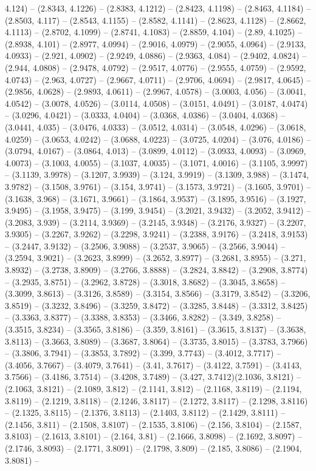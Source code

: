 4.124) -- (2.8343, 4.1226) -- (2.8383, 4.1212) -- (2.8423, 4.1198) -- (2.8463, 4.1184) -- (2.8503, 4.117) -- (2.8543, 4.1155) -- (2.8582, 4.1141) -- (2.8623, 4.1128) -- (2.8662, 4.1113) -- (2.8702, 4.1099) -- (2.8741, 4.1083) -- (2.8859, 4.104) -- (2.89, 4.1025) -- (2.8938, 4.101) -- (2.8977, 4.0994) -- (2.9016, 4.0979) -- (2.9055, 4.0964) -- (2.9133, 4.0933) -- (2.921, 4.0902) -- (2.9249, 4.0886) -- (2.9363, 4.084) -- (2.9402, 4.0824) -- (2.944, 4.0808) -- (2.9478, 4.0792) -- (2.9517, 4.0776) -- (2.9555, 4.0759) -- (2.9592, 4.0743) -- (2.963, 4.0727) -- (2.9667, 4.0711) -- (2.9706, 4.0694) -- (2.9817, 4.0645) -- (2.9856, 4.0628) -- (2.9893, 4.0611) -- (2.9967, 4.0578) -- (3.0003, 4.056) -- (3.0041, 4.0542) -- (3.0078, 4.0526) -- (3.0114, 4.0508) -- (3.0151, 4.0491) -- (3.0187, 4.0474) -- (3.0296, 4.0421) -- (3.0333, 4.0404) -- (3.0368, 4.0386) -- (3.0404, 4.0368) -- (3.0441, 4.035) -- (3.0476, 4.0333) -- (3.0512, 4.0314) -- (3.0548, 4.0296) -- (3.0618, 4.0259) -- (3.0653, 4.0242) -- (3.0688, 4.0223) -- (3.0725, 4.0204) -- (3.076, 4.0186) -- (3.0794, 4.0167) -- (3.0864, 4.013) -- (3.0899, 4.0112) -- (3.0933, 4.0093) -- (3.0969, 4.0073) -- (3.1003, 4.0055) -- (3.1037, 4.0035) -- (3.1071, 4.0016) -- (3.1105, 3.9997) -- (3.1139, 3.9978) -- (3.1207, 3.9939) -- (3.124, 3.9919) -- (3.1309, 3.988) -- (3.1474, 3.9782) -- (3.1508, 3.9761) -- (3.154, 3.9741) -- (3.1573, 3.9721) -- (3.1605, 3.9701) -- (3.1638, 3.968) -- (3.1671, 3.9661) -- (3.1864, 3.9537) -- (3.1895, 3.9516) -- (3.1927, 3.9495) -- (3.1958, 3.9475) -- (3.199, 3.9454) -- (3.2021, 3.9432) -- (3.2052, 3.9412) -- (3.2083, 3.939) -- (3.2114, 3.9369) -- (3.2145, 3.9348) -- (3.2176, 3.9327) -- (3.2207, 3.9305) -- (3.2267, 3.9262) -- (3.2298, 3.9241) -- (3.2388, 3.9176) -- (3.2418, 3.9153) -- (3.2447, 3.9132) -- (3.2506, 3.9088) -- (3.2537, 3.9065) -- (3.2566, 3.9044) -- (3.2594, 3.9021) -- (3.2623, 3.8999) -- (3.2652, 3.8977) -- (3.2681, 3.8955) -- (3.271, 3.8932) -- (3.2738, 3.8909) -- (3.2766, 3.8888) -- (3.2824, 3.8842) -- (3.2908, 3.8774) -- (3.2935, 3.8751) -- (3.2962, 3.8728) -- (3.3018, 3.8682) -- (3.3045, 3.8658) -- (3.3099, 3.8613) -- (3.3126, 3.8589) -- (3.3154, 3.8566) -- (3.3179, 3.8542) -- (3.3206, 3.8519) -- (3.3232, 3.8496) -- (3.3259, 3.8472) -- (3.3285, 3.8448) -- (3.3312, 3.8425) -- (3.3363, 3.8377) -- (3.3388, 3.8353) -- (3.3466, 3.8282) -- (3.349, 3.8258) -- (3.3515, 3.8234) -- (3.3565, 3.8186) -- (3.359, 3.8161) -- (3.3615, 3.8137) -- (3.3638, 3.8113) -- (3.3663, 3.8089) -- (3.3687, 3.8064) -- (3.3735, 3.8015) -- (3.3783, 3.7966) -- (3.3806, 3.7941) -- (3.3853, 3.7892) -- (3.399, 3.7743) -- (3.4012, 3.7717) -- (3.4056, 3.7667) -- (3.4079, 3.7641) -- (3.41, 3.7617) -- (3.4122, 3.7591) -- (3.4143, 3.7566) -- (3.4186, 3.7514) -- (3.4208, 3.7489) -- (3.427, 3.7412)(2.1036, 3.8121) -- (2.1063, 3.8121) -- (2.1089, 3.812) -- (2.1141, 3.812) -- (2.1168, 3.8119) -- (2.1194, 3.8119) -- (2.1219, 3.8118) -- (2.1246, 3.8117) -- (2.1272, 3.8117) -- (2.1298, 3.8116) -- (2.1325, 3.8115) -- (2.1376, 3.8113) -- (2.1403, 3.8112) -- (2.1429, 3.8111) -- (2.1456, 3.811) -- (2.1508, 3.8107) -- (2.1535, 3.8106) -- (2.156, 3.8104) -- (2.1587, 3.8103) -- (2.1613, 3.8101) -- (2.164, 3.81) -- (2.1666, 3.8098) -- (2.1692, 3.8097) -- (2.1746, 3.8093) -- (2.1771, 3.8091) -- (2.1798, 3.809) -- (2.185, 3.8086) -- (2.1904, 3.8081) -- 